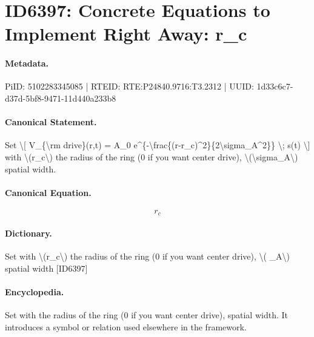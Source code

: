 \section*{ID6397: Concrete Equations to Implement Right Away: r\_c}
\paragraph{Metadata.}
PiID: 5102283345085 | RTEID: RTE:P24840.9716:T3.2312 | UUID: 1d33c6c7-d37d-5bf8-9471-11d440a233b8

\paragraph{Canonical Statement.}
Set \textbackslash{}[ V\_\{\textbackslash{}rm drive\}(r,t) = A\_0 e\textasciicircum{}\{-\textbackslash{}frac\{(r-r\_c)\textasciicircum{}2\}\{2\textbackslash{}sigma\_A\textasciicircum{}2\}\} \textbackslash{}; s(t) \textbackslash{}] with \textbackslash{}(r\_c\textbackslash{}) the radius of the ring (0 if you want center drive), \textbackslash{}(\textbackslash{}sigma\_A\textbackslash{}) spatial width.

\paragraph{Canonical Equation.}
\[
r_c
\]

\paragraph{Dictionary.}
Set with \textbackslash{}(r\_c\textbackslash{}) the radius of the ring (0 if you want center drive), \textbackslash{}( \_A\textbackslash{}) spatial width [ID6397]

\paragraph{Encyclopedia.}
Set with the radius of the ring (0 if you want center drive), spatial width. It introduces a symbol or relation used elsewhere in the framework.
